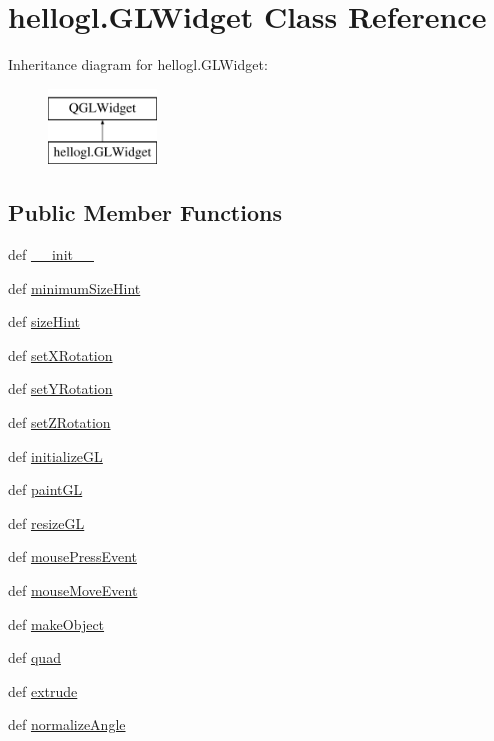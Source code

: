 \hypertarget{classhellogl_1_1GLWidget}{}\section{hellogl.\+G\+L\+Widget Class Reference}
\label{classhellogl_1_1GLWidget}
Inheritance diagram for hellogl.\+G\+L\+Widget\+:\begin{figure}[H]
\begin{center}
\leavevmode
\includegraphics[height=2.000000cm]{classhellogl_1_1GLWidget}
\end{center}
\end{figure}
\subsection*{Public Member Functions}
\begin{DoxyCompactItemize}
\item 
def \hyperlink{classhellogl_1_1GLWidget_a0cda9d4f073d0a59bb799c6ebd9f491a}{\+\_\+\+\_\+init\+\_\+\+\_\+}
\item 
def \hyperlink{classhellogl_1_1GLWidget_a7dd6b0fd7bb51bc858ff2aa0c0057b8f}{minimum\+Size\+Hint}
\item 
def \hyperlink{classhellogl_1_1GLWidget_a70068c140c5de47eaff03a5d3b7608f4}{size\+Hint}
\item 
def \hyperlink{classhellogl_1_1GLWidget_a9df8b6935ece8a21c36f160fd0f766a8}{set\+X\+Rotation}
\item 
def \hyperlink{classhellogl_1_1GLWidget_a2ec195981231d08b0a03dfb3672211b3}{set\+Y\+Rotation}
\item 
def \hyperlink{classhellogl_1_1GLWidget_a42339173690c3411e51c535ae646217c}{set\+Z\+Rotation}
\item 
def \hyperlink{classhellogl_1_1GLWidget_a58076920e09024f825e853ab213eea7f}{initialize\+G\+L}
\item 
def \hyperlink{classhellogl_1_1GLWidget_aac91be49662c608ce2bdee9e379b400a}{paint\+G\+L}
\item 
def \hyperlink{classhellogl_1_1GLWidget_a768892297ec07322487a818021c4b330}{resize\+G\+L}
\item 
def \hyperlink{classhellogl_1_1GLWidget_a4e402e5c9ed92d6aa6741f2c3da56bda}{mouse\+Press\+Event}
\item 
def \hyperlink{classhellogl_1_1GLWidget_a65ed2f54dd00bac80e0e47d4a1a8571b}{mouse\+Move\+Event}
\item 
def \hyperlink{classhellogl_1_1GLWidget_acbb1b0c0801f247f8d2897a4356623af}{make\+Object}
\item 
def \hyperlink{classhellogl_1_1GLWidget_a252aed98b73a1062706f458e3d42e27f}{quad}
\item 
def \hyperlink{classhellogl_1_1GLWidget_a6f2d8d24566c40affd49bfddd33fb442}{extrude}
\item 
def \hyperlink{classhellogl_1_1GLWidget_ad09b3c496f5fd4eb6817e95e1be6febb}{normalize\+Angle}
\end{DoxyCompactItemize}
